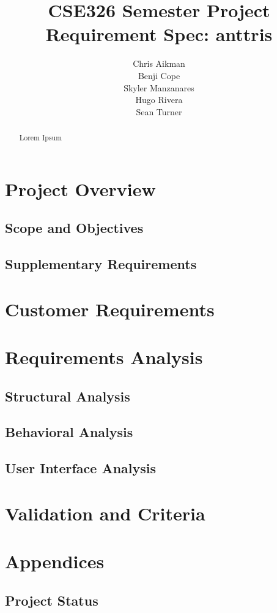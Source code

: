 \documentclass[12pt]{article}
\begin{document}
\title{CSE326 Semester Project Requirement Spec: anttris}
\author{Chris Aikman\\Benji Cope\\Skyler Manzanares\\Hugo Rivera\\Sean Turner}
\maketitle

\begin{abstract}
Lorem Ipsum
\end{abstract}

\section{Project Overview}

\subsection{Scope and Objectives}

\subsection{Supplementary Requirements}

\section{Customer Requirements}

\section{Requirements Analysis}

\subsection{Structural Analysis}

\subsection{Behavioral Analysis}

\subsection{User Interface Analysis}

\section{Validation and Criteria}

\section{Appendices}

\subsection{Project Status}
\end{document}
